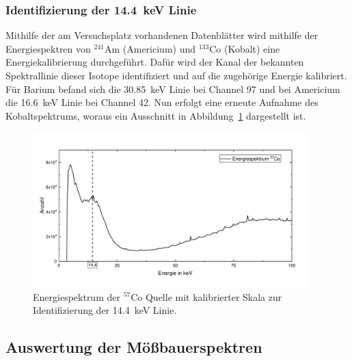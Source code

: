 \documentclass[a4paper,twoside,final]{article}
\begin{document}
\subsubsection{Identifizierung der \SI{14,4}{\kilo\electronvolt} Linie}
Mithilfe der am Versuchsplatz vorhandenen Datenblätter wird mithilfe der Energiespektren von $^{241}$Am (Americium) und $^{133}$Co (Kobalt) eine Energiekalibrierung durchgeführt. Dafür wird der Kanal der bekannten Spektrallinie dieser Isotope identifiziert und auf die zugehörige Energie kalibriert. Für Barium befand sich die \SI{30,85}{\kilo\electronvolt} Linie bei Channel 97 und bei Americium die \SI{16,6}{\kilo\electronvolt} Linie bei Channel 42. Nun erfolgt eine erneute Aufnahme des Kobaltspektrums, woraus ein Ausschnitt in Abbildung~\ref{fig:Spektrum_Co} dargestellt ist.
\begin{figure}[htp]
    \vspace{-0.5cm}
    \centering
    \includegraphics[width=0.95\textwidth]{Bilder/Energiespektrum_Co_kalibriert.pdf}
    \caption{Energiespektrum der $^{57}$Co Quelle mit kalibrierter Skala zur Identifizierung der \SI{14,4}{\kilo\electronvolt} Linie.}
    \label{fig:Spektrum_Co}
\end{figure}
%
%
\subsection{Auswertung der Mößbauerspektren}
\end{document}
